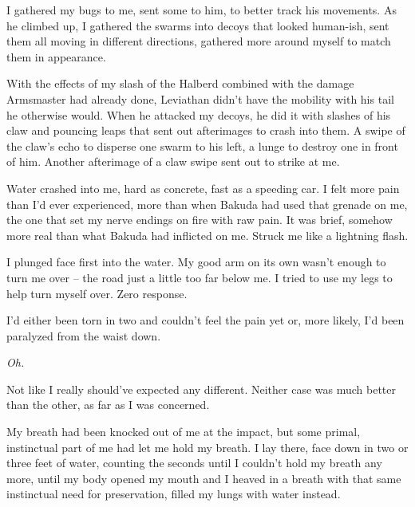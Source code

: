 I gathered my bugs to me, sent some to him, to better track his movements.  As he climbed up, I gathered the swarms into decoys that looked human-ish, sent them all moving in different directions, gathered more around myself to match them in appearance.



With the effects of my slash of the Halberd combined with the damage Armsmaster had already done, Leviathan didn't have the mobility with his tail he otherwise would.  When he attacked my decoys, he did it with slashes of his claw and pouncing leaps that sent out afterimages to crash into them.  A swipe of the claw's echo to disperse one swarm to his left, a lunge to destroy one in front of him.  Another afterimage of a claw swipe sent out to strike at me.



Water crashed into me, hard as concrete, fast as a speeding car.  I felt more pain than I'd ever experienced, more than when Bakuda had used that grenade on me, the one that set my nerve endings on fire with raw pain.  It was brief, somehow more real than what Bakuda had inflicted on me.  Struck me like a lightning flash.



I plunged face first into the water.  My good arm on its own wasn't enough to turn me over – the road just a little too far below me.  I tried to use my legs to help turn myself over.  Zero response.



I'd either been torn in two and couldn't feel the pain yet or, more likely, I'd been paralyzed from the waist down.



\emph{Oh.}



Not like I really should've expected any different.  Neither case was much better than the other, as far as I was concerned.



My breath had been knocked out of me at the impact, but some primal, instinctual part of me had let me hold my breath.  I lay there, face down in two or three feet of water, counting the seconds until I couldn't hold my breath any more, until my body opened my mouth and I heaved in a breath with that same instinctual need for preservation, filled my lungs with water instead.




